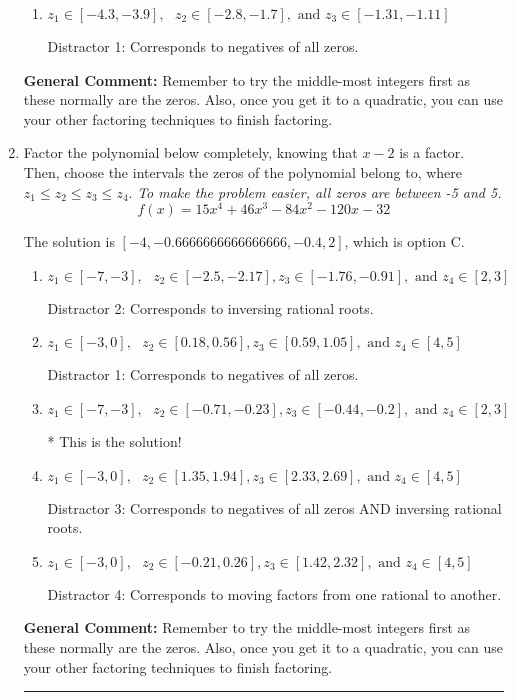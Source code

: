 \documentclass{extbook}[14pt]
\newcommand{\litem}[1]{\item #1

\rule{\textwidth}{0.4pt}}
\begin{document}
\begin{enumerate}
{\begin{enumerate}[label=\Alph*.]
* This is the solution!
\item \( z_1 \in [-4.3, -3.9], \text{   }  z_2 \in [-2.8, -1.7], \text{   and   } z_3 \in [-1.31, -1.11] \)

 Distractor 1: Corresponds to negatives of all zeros.
\end{enumerate}

\textbf{General Comment:} Remember to try the middle-most integers first as these normally are the zeros. Also, once you get it to a quadratic, you can use your other factoring techniques to finish factoring.
}
\litem{
Factor the polynomial below completely, knowing that $x-2$ is a factor. Then, choose the intervals the zeros of the polynomial belong to, where $z_1 \leq z_2 \leq z_3 \leq z_4$. \textit{To make the problem easier, all zeros are between -5 and 5.}
\[ f(x) = 15x^{4} +46 x^{3} -84 x^{2} -120 x -32 \]

The solution is \( [-4, -0.6666666666666666, -0.4, 2] \), which is option C.\begin{enumerate}[label=\Alph*.]
\item \( z_1 \in [-7, -3], \text{   }  z_2 \in [-2.5, -2.17], z_3 \in [-1.76, -0.91], \text{   and   } z_4 \in [2, 3] \)

 Distractor 2: Corresponds to inversing rational roots.
\item \( z_1 \in [-3, 0], \text{   }  z_2 \in [0.18, 0.56], z_3 \in [0.59, 1.05], \text{   and   } z_4 \in [4, 5] \)

 Distractor 1: Corresponds to negatives of all zeros.
\item \( z_1 \in [-7, -3], \text{   }  z_2 \in [-0.71, -0.23], z_3 \in [-0.44, -0.2], \text{   and   } z_4 \in [2, 3] \)

* This is the solution!
\item \( z_1 \in [-3, 0], \text{   }  z_2 \in [1.35, 1.94], z_3 \in [2.33, 2.69], \text{   and   } z_4 \in [4, 5] \)

 Distractor 3: Corresponds to negatives of all zeros AND inversing rational roots.
\item \( z_1 \in [-3, 0], \text{   }  z_2 \in [-0.21, 0.26], z_3 \in [1.42, 2.32], \text{   and   } z_4 \in [4, 5] \)

 Distractor 4: Corresponds to moving factors from one rational to another.
\end{enumerate}

\textbf{General Comment:} Remember to try the middle-most integers first as these normally are the zeros. Also, once you get it to a quadratic, you can use your other factoring techniques to finish factoring.
}
\end{enumerate}
\end{document}
